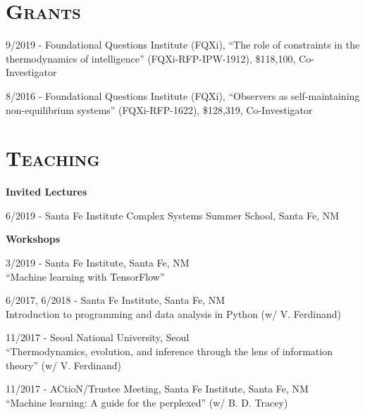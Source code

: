 \documentclass[margin,line,centered]{res}
\begin{document}
\begin{resume}



\section{\textsc{Grants}}
9/2019 - Foundational Questions Institute (FQXi), 
``The role of constraints in the thermodynamics of intelligence'' (FQXi-RFP-IPW-1912),
\$118,100, Co-Investigator

8/2016 - Foundational Questions Institute (FQXi), 
``Observers as self-maintaining non-equilibrium systems'' (FQXi-RFP-1622),
\$128,319, Co-Investigator


\section{\textsc{Teaching}}

\textbf{Invited Lectures}

6/2019 - Santa Fe Institute Complex Systems Summer School, Santa Fe, NM

\vspace{5pt}

\textbf{Workshops}

3/2019 - Santa Fe Institute, Santa Fe, NM\\
``Machine learning with TensorFlow''

6/2017, 6/2018 - Santa Fe Institute, Santa Fe, NM\\
Introduction to programming and data analysis in Python (w/ V. Ferdinand)

11/2017 - Seoul National University, Seoul \\
``Thermodynamics, evolution, and inference through the lens of information theory'' (w/ V. Ferdinand)

11/2017 - ACtioN/Trustee Meeting, Santa Fe Institute, Santa Fe, NM\\
``Machine learning: A guide for the perplexed'' (w/ B. D. Tracey)


\vspace{5pt}


\end{resume}
\end{document}
